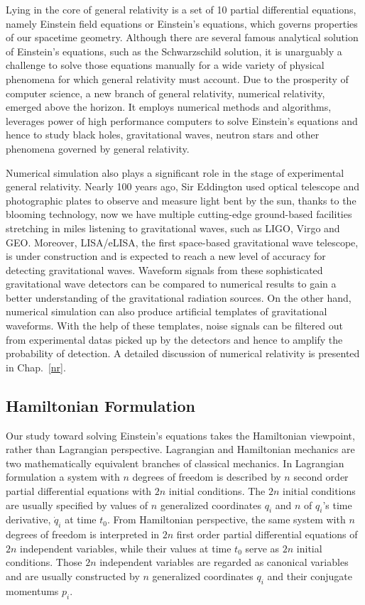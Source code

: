 Lying in the core of general relativity is a set of 10 partial differential equations, namely Einstein field equations or Einstein's equations, which governs properties of our spacetime geometry. Although there are several famous analytical solution of Einstein's equations, such as the Schwarzschild solution, it is unarguably a challenge to solve those equations manually for a wide variety of physical phenomena for which general relativity must account. Due to the prosperity of computer science, a new branch of general relativity, numerical relativity, emerged above the horizon. It employs numerical methods and algorithms, leverages power of high performance computers to solve Einstein's equations and hence to study black holes, gravitational waves, neutron stars and other phenomena governed by general relativity.

Numerical simulation also plays a significant role in the stage of experimental general relativity. Nearly 100 years ago, Sir Eddington used optical telescope and photographic plates to observe and measure light bent by the sun, thanks to the blooming technology, now we have multiple cutting-edge ground-based facilities stretching in miles listening to gravitational waves, such as LIGO, Virgo and GEO. Moreover, LISA/eLISA, the first space-based gravitational wave telescope, is under construction and is expected to reach a new level of accuracy for detecting gravitational waves. Waveform signals from these sophisticated gravitational wave detectors can be compared to numerical results to gain a better understanding of the gravitational radiation sources. On the other hand, numerical simulation can also produce artificial templates of gravitational waveforms. With the help of these templates, noise signals can be filtered out from experimental datas picked up by the detectors and hence to amplify the probability of detection. A detailed discussion of numerical relativity is presented in Chap.~\ref{nr}. 
\subsection{Hamiltonian Formulation}\label{ham}
Our study toward solving Einstein's equations takes the Hamiltonian viewpoint, rather than Lagrangian perspective. Lagrangian and Hamiltonian mechanics are two mathematically equivalent branches of classical mechanics. In Lagrangian formulation a system with $n$ degrees of freedom is described by $n$ second order partial differential equations with $2n$ initial conditions. The $2n$ initial conditions are usually specified by values of $n$ generalized coordinates $q_{i}$ and $n$ of $q_{i}$'s time derivative, ${\dot q}_{i}$ at time $t_{0}$. From Hamiltonian perspective, the same system with $n$ degrees of freedom is interpreted in $2n$ first order partial differential equations of $2n$ independent variables, while their values at time $t_{0}$ serve as $2n$ initial conditions. Those $2n$ independent variables are regarded as canonical variables and are usually constructed by $n$ generalized coordinates $q_{i}$ and their conjugate momentums $p_{i}$.

